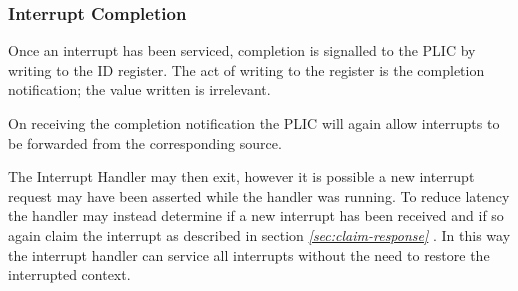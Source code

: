 \subsubsection{Interrupt Completion}

Once an interrupt has been serviced, completion is signalled to the PLIC by writing to the ID register.
The act of writing to the register is the completion notification; the value written is irrelevant.

On receiving the completion notification the PLIC will again allow interrupts to be forwarded from the corresponding source.

The Interrupt Handler may then exit, however it is possible a new interrupt request may have been asserted while the handler was running.
To reduce latency the handler may instead determine if a new interrupt has been received and if so again claim the interrupt as described in
section \emph{\ref{sec:claim-response} }.
In this way the interrupt handler can service all interrupts without the need to restore the interrupted context.
